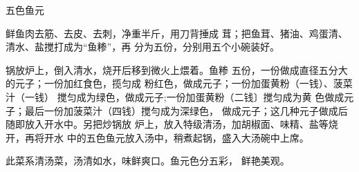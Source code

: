 \begin{recipe}[五福鱼元]{五色鱼元}

\ingredients


\cooking

\step 鲜鱼肉去筋、去皮、去刺，净重半斤，用刀背捶成 茸；把鱼茸、猪油、鸡蛋清、清水、盐搅打成为“鱼糁”，再 分为五份，分别用五个小碗装好。

\step 锅放炉上，倒入清水，烧开后移到微火上煨着。鱼糁 五份，一份做成直径五分大的元子；一份加红食色，揽匀成 粉红色，做成元子；一份加蛋黄粉（一钱）、菠菜汁（一钱） 搅匀成为绿色，做成元子;一份加蛋黄粉（二钱〕搅匀成为黄 色做成元子；最后一份加菠菜汁（四钱）搅勻成为深绿色， 做成元子；这几种元子做成后随即放入开水中。另把炒锅放 炉上，放入特级清汤，加胡椒面、味精、盐等烧开，再将开水 中的五色鱼元放入汤中，稍煮起锅，盛入大汤碗中上席。

\notes

此菜系清汤菜，汤清如水，味鲜爽口。鱼元色分五彩， 鲜艳美观。

\end{recipe}

